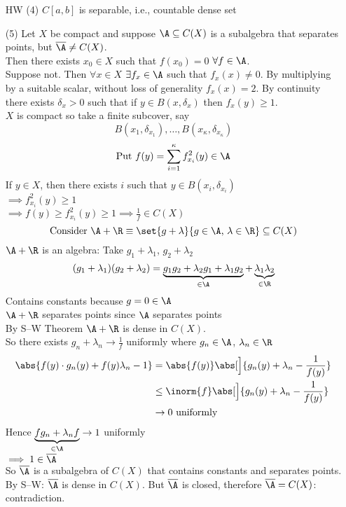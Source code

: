 \begin{enumerate}
\item[HW (4)] $C[a,b]$ is separable, i.e., countable dense set
\item[(5)]\prop Let $X$ be compact and suppose $\A\subseteq C(X)$ is a subalgebra that separates points, but $\overline\A\neq C(X)$. \\
Then there exists $x_0\in X$ such that $f(x_0)=0$ $\forall f\in\A$. \\
\pf Suppose not.  Then $\forall x\in X$ $\exists f_x\in\A$ such that $f_x(x)\neq0$.  By multiplying by a suitable scalar, without loss of generality $f_x(x)=2$.  By continuity there exists $\delta_x>0$ such that if $y\in B(x,\delta_x)$ then $f_x(y)\geq1$. \\
$X$ is compact so take a finite subcover, say
\[ B(x_1,\delta_{x_1}),\dotsc,B(x_\kappa,\delta_{x_\kappa}) \]
\[ \text{Put } f(y) = \sum_{i=1}^\kappa f_{x_i}^2(y) \in \A \]
If $y\in X$, then there exists $i$ such that $y\in B(x_i,\delta_{x_i})$ \\
$\implies f_{x_i}^2(y)\geq1$ \\
$\implies f(y) \geq f_{x_i}^2(y) \geq 1 \implies \frac{1}{f}\in C(X)$
\[ \text{Consider } \A+\R \equiv \set{g+\lambda}{g\in\A\text{, }\lambda\in\R} \subseteq C(X) \]
$\A+\R$ is an algebra: Take $g_1+\lambda_1$, $g_2+\lambda_2$
\[ (g_1+\lambda_1)(g_2+\lambda_2) = \underbrace{g_1g_2 + \lambda_2g_1 + \lambda_1g_2}_{\in\A} + \underbrace{\lambda_1\lambda_2}_{\in \R} \]
Contains constants because $g=0\in\A$ \\
$\A+\R$ separates points since $\A$ separates points \\
By S--W Theorem $\A+\R$ is dense in $C(X)$. \\
So there exists $g_n+\lambda_n\to\frac{1}{f}$ uniformly where $g_n\in\A$, $\lambda_n\in\R$
\begin{align*}
\abs{f(y)\cdot g_n(y) + f(y)\lambda_n - 1} &= \abs{f(y)}\abs[\Big]{g_n(y)+\lambda_n-\frac{1}{f(y)}} \\
&\leq \inorm{f} \abs[\Big]{g_n(y)+\lambda_n-\frac{1}{f(y)}} \\
&\to0\text{ uniformly}
\end{align*}
Hence $\underbrace{fg_n+\lambda_nf}_{\in\A}\to1$ uniformly \\
$\implies 1 \in \overline\A$ \\
So $\overline\A$ is a subalgebra of $C(X)$ that contains constants and separates points. \\
By S--W: $\overline\A$ is dense in $C(X)$.  But $\overline\A$ is closed, therefore $\overline\A=C(X)$: contradiction.
\end{enumerate}
